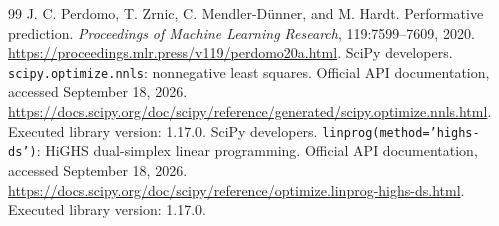 \documentclass[11pt]{article}
\theoremstyle{remark}\newtheorem{remark}[proposition]{Remark}
\begin{document}
\begin{thebibliography}{99}
 J. C. Perdomo, T. Zrnic, C. Mendler-D\"unner, and M. Hardt. Performative prediction. \emph{Proceedings of Machine Learning Research}, 119:7599--7609, 2020. \url{https://proceedings.mlr.press/v119/perdomo20a.html}.
 SciPy developers. \texttt{scipy.optimize.nnls}: nonnegative least squares. Official API documentation, accessed September 18, 2026. \url{https://docs.scipy.org/doc/scipy/reference/generated/scipy.optimize.nnls.html}. Executed library version: 1.17.0.
 SciPy developers. \texttt{linprog(method='highs-ds')}: HiGHS dual-simplex linear programming. Official API documentation, accessed September 18, 2026. \url{https://docs.scipy.org/doc/scipy/reference/optimize.linprog-highs-ds.html}. Executed library version: 1.17.0.
\end{thebibliography}
\endgroup
\end{document}
